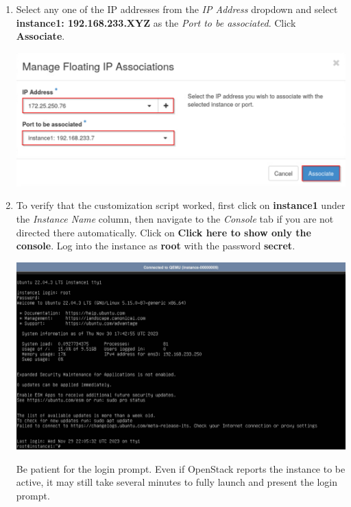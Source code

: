 \documentclass[letterpaper, 12pt]{article}
\begin{document}
\begin{enumerate}
    \item Select any one of the IP addresses from the \textit{IP Address} dropdown and select \textbf{instance1: 192.168.233.XYZ} as the \textit{Port to be associated}.
    Click \textbf{Associate}.

    \begin{center}
        \includegraphics[width=\linewidth]{images/part2/step12.png}
    \end{center}

    \item To verify that the customization script worked, first click on \textbf{instance1} under the \textit{Instance Name} column, then navigate to the \textit{Console} tab if you are not directed there automatically.
    Click on \textbf{Click here to show only the console}.
    Log into the instance as \textbf{root} with the password \textbf{secret}.

    \begin{center}
        \includegraphics[width=\linewidth]{images/part2/step13.png}
    \end{center}

    \begin{notebox}
        Be patient for the login prompt.
        Even if OpenStack reports the instance to be active, it may still take several minutes to fully launch and present the login prompt.
    \end{notebox}


\end{enumerate}
\end{document}
